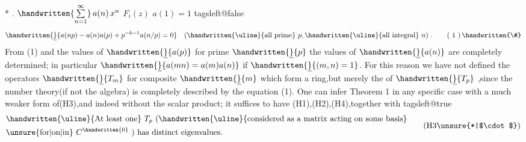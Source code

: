 *  .  $\handwritten{\sum\limits_{n=1}^{\infty}}\,a(n)\,x^{n}$  $F_i(z)$  $a(1)=1$ 
\csname tagsleft@false\endcsname
\[
\handwritten{\underline}{a(np)-a(n)a(p)+p^{-k-1}a(n/p)=0}\quad
(\text{\handwritten{\uline}{all prime} }p,\text{\handwritten{\uline}{all integral} }n)\ .
\tag*{( 1 )\,\handwritten{\#}}
\]
From (1) and the values of $\handwritten{\underline}{a(p)}$ for prime $\handwritten{\underline}{p}$ the values of $\handwritten{\underline}{a(n)}$ are completely determined; in particular $\handwritten{\underline}{a(mn)=a(m)a(n)}$ if $\handwritten{\underline}{(m,n)=1}$. For this reason we have not defined the operators $\handwritten{\underline}{T_m}$ for composite $\handwritten{\underline}{m}$ which form a ring,but merely the  of $\handwritten{\underline}{T_p}$ ,since the number theory(if not the algebra) is completely described by the equation (1). One can infer Theorem 1 in any specific case with a much weaker form of(H3),and indeed without the scalar product; it suffices to have (H1),(H2),(H4),together with
\csname tagsleft@true\endcsname
\[
\begin{aligned}
&\text{\handwritten{\uline}{At least one} } T_p\ \text{(\handwritten{\uline}{considered as a matrix acting on some basis}}\\
&\text{\unsure{for|on|in} } C^{\handwritten{0}}\text{ ) has distinct eigenvalues.}
\end{aligned}
\tag*{(H3\unsure{*|$\cdot$})}
\]
\endgroup

